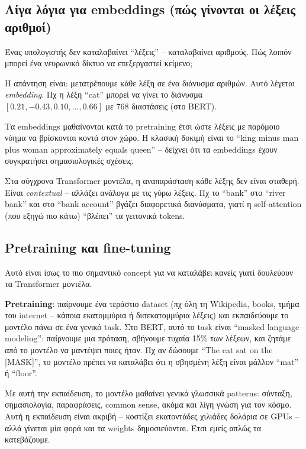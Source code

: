 \documentclass[12pt]{fphw}
\begin{document}
\subsection{Λίγα λόγια για embeddings (πώς γίνονται οι λέξεις αριθμοί)}

Ένας υπολογιστής δεν καταλαβαίνει ``λέξεις'' -- καταλαβαίνει αριθμούς. Πώς λοιπόν μπορεί ένα νευρωνικό δίκτυο να επεξεργαστεί κείμενο;

Η απάντηση είναι: μετατρέπουμε κάθε λέξη σε ένα διάνυσμα αριθμών. Αυτό λέγεται \emph{embedding}. Πχ η λέξη ``cat'' μπορεί να γίνει το διάνυσμα $[0.21, -0.43, 0.10, \dots, 0.66]$ με 768 διαστάσεις (στο BERT).

Τα embeddings μαθαίνονται κατά το pretraining έτσι ώστε λέξεις με παρόμοιο νόημα να βρίσκονται κοντά στον χώρο. Η κλασική δοκιμή είναι το ``king minus man plus woman approximately equals queen'' -- δείχνει ότι τα embeddings έχουν συγκρατήσει σημασιολογικές σχέσεις.

Στα σύγχρονα Transformer μοντέλα, η αναπαράσταση κάθε λέξης δεν είναι σταθερή. Είναι \emph{contextual} -- αλλάζει ανάλογα με τις γύρω λέξεις. Πχ το ``bank'' στο ``river bank'' και στο ``bank account'' βγάζει διαφορετικά διανύσματα, γιατί η self-attention (που εξηγώ πιο κάτω) ``βλέπει'' τα γειτονικά tokens.

\subsection{Pretraining και fine-tuning}

Αυτό είναι ίσως το πιο σημαντικό concept για να καταλάβει κανείς γιατί δουλεύουν τα Transformer μοντέλα.

\textbf{Pretraining}: παίρνουμε ένα τεράστιο dataset (πχ όλη τη Wikipedia, books, τμήμα του internet -- κάποια εκατομμύρια ή δισεκατομμύρια λέξεις) και εκπαιδεύουμε το μοντέλο πάνω σε ένα γενικό task. Στο BERT, αυτό το task είναι ``masked language modeling'': παίρνουμε μια πρόταση, σβήνουμε τυχαία 15\% των λέξεων, και ζητάμε από το μοντέλο να μαντέψει ποιες ήταν. Πχ αν δώσουμε ``The cat sat on the [MASK]'', το μοντέλο πρέπει να καταλάβει ότι η σβησμένη λέξη είναι μάλλον ``mat'' ή ``floor''.

Με αυτή την εκπαίδευση, το μοντέλο μαθαίνει γενικά γλωσσικά patterns: σύνταξη, σημασιολογία, παραφράσεις, common sense, ακόμα και λίγη γνώση για τον κόσμο. Αυτή η εκπαίδευση είναι ακριβή -- κοστίζει εκατοντάδες χιλιάδες δολάρια σε GPUs -- αλλά γίνεται μία φορά και τα weights δημοσιεύονται. Έτσι εμείς απλώς τα κατεβάζουμε.
\end{document}
